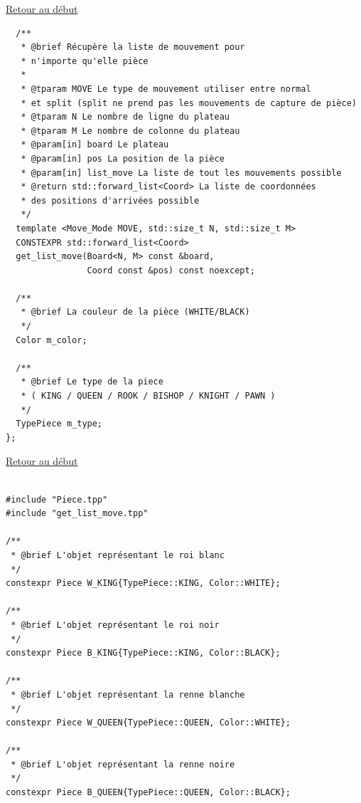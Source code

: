 {\begin{frame}[fragile]
\begin{verbatim}
\end{verbatim}
\end{frame}

\begin{frame}[fragile]
\hyperlink{conclusion}{Retour au début}\newline
\begin{verbatim}
  /**
   * @brief Récupère la liste de mouvement pour
   * n'importe qu'elle pièce
   *
   * @tparam MOVE Le type de mouvement utiliser entre normal
   * et split (split ne prend pas les mouvements de capture de pièce)
   * @tparam N Le nombre de ligne du plateau
   * @tparam M Le nombre de colonne du plateau
   * @param[in] board Le plateau
   * @param[in] pos La position de la pièce
   * @param[in] list_move La liste de tout les mouvements possible
   * @return std::forward_list<Coord> La liste de coordonnées
   * des positions d'arrivées possible
   */
  template <Move_Mode MOVE, std::size_t N, std::size_t M>
  CONSTEXPR std::forward_list<Coord>
  get_list_move(Board<N, M> const &board,
                Coord const &pos) const noexcept;

  /**
   * @brief La couleur de la pièce (WHITE/BLACK)
   */
  Color m_color;

  /**
   * @brief Le type de la piece
   * ( KING / QUEEN / ROOK / BISHOP / KNIGHT / PAWN )
   */
  TypePiece m_type;
};
\end{verbatim}
\end{frame}

\begin{frame}[fragile]
\hyperlink{conclusion}{Retour au début}\newline
\begin{verbatim}

#include "Piece.tpp"
#include "get_list_move.tpp"

/**
 * @brief L'objet représentant le roi blanc
 */
constexpr Piece W_KING{TypePiece::KING, Color::WHITE};

/**
 * @brief L'objet représentant le roi noir
 */
constexpr Piece B_KING{TypePiece::KING, Color::BLACK};

/**
 * @brief L'objet représentant la renne blanche
 */
constexpr Piece W_QUEEN{TypePiece::QUEEN, Color::WHITE};

/**
 * @brief L'objet représentant la renne noire
 */
constexpr Piece B_QUEEN{TypePiece::QUEEN, Color::BLACK};


\end{verbatim}
\end{frame}}
